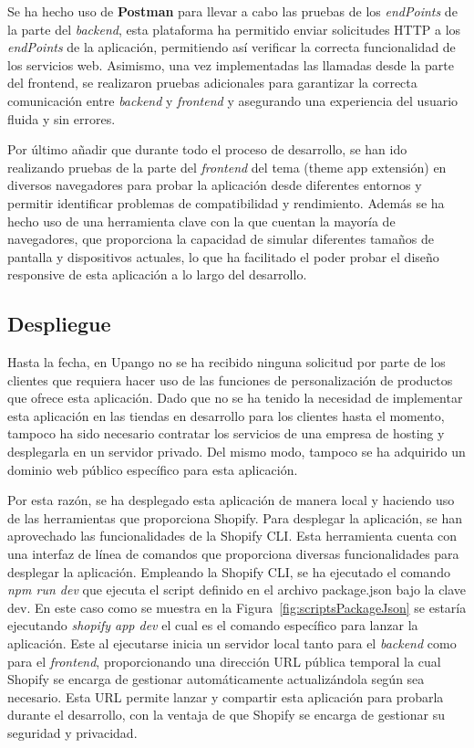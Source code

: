 \documentclass[11pt]{article}
\begin{document}
Se ha hecho uso de \textbf{Postman} para llevar a cabo las pruebas de los \textit{endPoints} de la parte del \textit{backend}, esta plataforma ha permitido enviar 
solicitudes HTTP a los \textit{endPoints} de la aplicación, permitiendo así verificar la correcta funcionalidad de los servicios web. Asimismo, una vez implementadas
las llamadas desde la parte del frontend, se realizaron pruebas adicionales para garantizar la correcta comunicación entre \textit{backend} y \textit{frontend} y asegurando una
experiencia del usuario fluida y sin errores.

Por último añadir que durante todo el proceso de desarrollo, se han ido realizando pruebas de la parte del \textit{frontend} del tema (theme app extensión) en diversos
navegadores para probar la aplicación desde diferentes entornos y permitir identificar problemas de compatibilidad y rendimiento.
Además se ha hecho uso de una herramienta clave con la que cuentan la mayoría de navegadores, que proporciona la capacidad de simular diferentes 
tamaños de pantalla y dispositivos actuales, lo que ha facilitado el poder probar el diseño responsive de esta aplicación a lo largo del desarrollo.

\clearpage
\subsection{Despliegue}
Hasta la fecha, en Upango no se ha recibido ninguna solicitud por parte de los clientes que requiera hacer uso de las funciones de personalización de productos
que ofrece esta aplicación. Dado que no se ha tenido la necesidad de implementar esta aplicación en las tiendas en desarrollo para los clientes hasta el momento, tampoco ha sido 
necesario contratar los servicios de una empresa de hosting y desplegarla en un servidor privado. Del mismo modo, tampoco se ha adquirido un dominio web público 
específico para esta aplicación.

Por esta razón, se ha desplegado esta aplicación de manera local y haciendo uso de las herramientas que proporciona Shopify. Para desplegar la aplicación,
se han aprovechado las funcionalidades de la Shopify CLI. Esta herramienta cuenta con una interfaz de línea de comandos que proporciona diversas funcionalidades para desplegar la aplicación.
Empleando la Shopify CLI, se ha ejecutado el comando \textit{npm run dev} que ejecuta el script definido en el archivo package.json bajo la clave dev. En este caso como se muestra en la Figura~\ref{fig:scriptsPackageJson} se estaría ejecutando \textit{shopify app dev} el cual es el comando específico para lanzar la aplicación.
Este al ejecutarse inicia un servidor local tanto para el \textit{backend} como para el \textit{frontend}, proporcionando
una dirección URL pública temporal la cual Shopify se encarga de gestionar automáticamente actualizándola según sea necesario. Esta URL permite lanzar y compartir esta aplicación para probarla durante el desarrollo, con la ventaja de que 
Shopify se encarga de gestionar su seguridad y privacidad.
\end{document}
